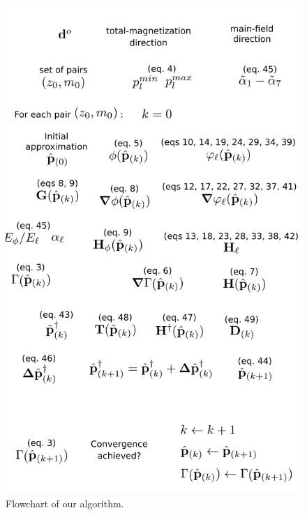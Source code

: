 \begin{figure}
    \centering
    \includegraphics[scale=0.8]{figures/flowchart.png}
    \caption{Flowchart of our algorithm.}
    \label{fig:flowchart}
\end{figure}


